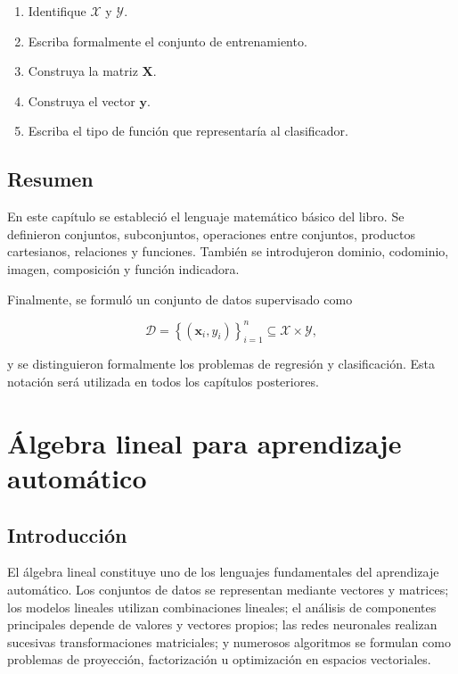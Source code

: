 \documentclass[
  spanish,
  11pt,
  letterpaper,
  DIV=11,
  numbers=noendperiod]{scrreprt}
\providecommand{\tightlist}{%
  \setlength{\itemsep}{0pt}\setlength{\parskip}{0pt}}
\theoremstyle{definition}
\theoremstyle{plain}
\theoremstyle{definition}
\theoremstyle{remark}
\begin{document}
\begin{enumerate}
\def\labelenumi{\arabic{enumi}.}
\tightlist
\item
  Identifique \(\mathcal{X}\) y \(\mathcal{Y}\).
\item
  Escriba formalmente el conjunto de entrenamiento.
\item
  Construya la matriz \(\mathbf{X}\).
\item
  Construya el vector \(\mathbf{y}\).
\item
  Escriba el tipo de función que representaría al clasificador.
\end{enumerate}

\section{Resumen}\label{resumen}

En este capítulo se estableció el lenguaje matemático básico del libro.
Se definieron conjuntos, subconjuntos, operaciones entre conjuntos,
productos cartesianos, relaciones y funciones. También se introdujeron
dominio, codominio, imagen, composición y función indicadora.

Finalmente, se formuló un conjunto de datos supervisado como

\[
\mathcal{D}
=
\left\{
(\mathbf{x}_i,y_i)
\right\}_{i=1}^{n}
\subseteq
\mathcal{X}\times\mathcal{Y},
\]

y se distinguieron formalmente los problemas de regresión y
clasificación. Esta notación será utilizada en todos los capítulos
posteriores.

\chapter{Álgebra lineal para aprendizaje
automático}\label{sec-algebra-lineal}

\section{Introducción}\label{introducciuxf3n-2}

El álgebra lineal constituye uno de los lenguajes fundamentales del
aprendizaje automático. Los conjuntos de datos se representan mediante
vectores y matrices; los modelos lineales utilizan combinaciones
lineales; el análisis de componentes principales depende de valores y
vectores propios; las redes neuronales realizan sucesivas
transformaciones matriciales; y numerosos algoritmos se formulan como
problemas de proyección, factorización u optimización en espacios
vectoriales.
\end{document}
